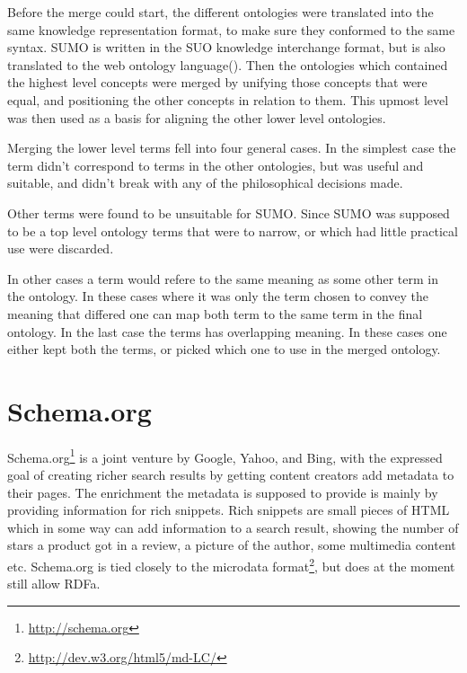 Before the merge could start, the different ontologies were translated into the same knowledge representation format,
to make sure they conformed to the same syntax\citep{Niles2001}.
SUMO is written in the SUO knowledge interchange format,
but is also translated to the web ontology language()\citep{Benzmuller2012}.
Then the ontologies which contained the highest level concepts were merged by unifying those concepts that were equal,
and positioning the other concepts in relation to them.
This upmost level was then used as a basis for aligning the other lower level ontologies\citep{Niles2001}.


Merging the lower level terms fell into four general cases.
In the simplest case the term didn't correspond to terms in the other ontologies,
but was useful and suitable, and didn't break with any of the philosophical decisions made.

Other terms were found to be unsuitable for SUMO.
Since SUMO was supposed to be a top level ontology terms that were to narrow,
or which had little practical use were discarded.

In other cases a term would refere to the same meaning as some other term in the ontology.
In these cases where it was only the term chosen to convey the meaning that differed one can map both term to the same
term in the final ontology.
In the last case the terms has overlapping meaning.
In these cases one either kept both the terms, or picked which one to use in the merged ontology.


\section{Schema.org}
\label{schemadotorg}
Schema.org\footnote{\url{http://schema.org}} is a joint venture by Google, Yahoo, and Bing,
with the expressed goal of creating richer search results by getting content creators add metadata to their pages.
The enrichment the metadata is supposed to provide is mainly by providing information for rich snippets\citep{Guha2011}.
Rich snippets are small pieces of HTML which in some way can add information to a search result,
showing the number of stars a product got in a review, a picture of the author, some multimedia content etc\citep{Mayer2009}.
Schema.org is tied closely to the microdata format\footnote{\url{http://dev.w3.org/html5/md-LC/}},
but does at the moment still allow RDFa.


